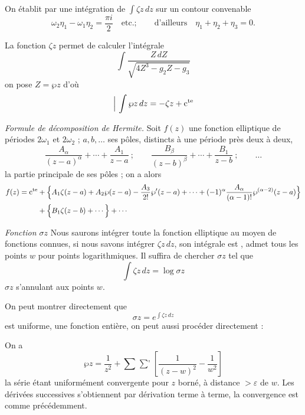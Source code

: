 \documentclass[11pt,a4paper]{article}
\begin{document}
On établit par une intégration de $\int \zeta z\,dz$ sur un contour
convenable
\[
\omega_2\eta_1 - \omega_1\eta_2 = \frac{\pi i}{2} \quad \text{etc.} ;
\qquad \text{d'ailleurs} \quad \eta_1 + \eta_2 + \eta_3 = 0 .
\]

La fonction $\zeta z$ permet de calculer l'intégrale
\[
\int \frac{Z\,dZ}{\sqrt{4Z^3 - g_2Z - g_3}}
\]
on pose $Z = \wp z$ d'où
\[
\Bigl|\ \int \wp z\,dz = -\zeta z + \text{c}^{\text{te}}
\]

\struck{\ill{} \ill{} \ill{},}

\emph{Formule de décomposition de Hermite.} Soit $f(z)$ une fonction elliptique
de périodes $2\omega_1$ et $2\omega_2$ ; $a, b, \ldots$ ses pôles, distincts à une
période près deux à deux,
\[
\frac{A_\alpha}{(z-a)^\alpha} + \cdots + \frac{A_1}{z-a} \ ; \qquad
\frac{B_\beta}{(z-b)^\beta} + \cdots + \frac{B_1}{z-b} \ ; \qquad \ldots
\]
la partie principale de ses pôles ; on a alors
\[
\begin{aligned}
f(z) = \text{c}^{\text{te}} &+ \Bigl\lbrace A_1\zeta(z-a) + A_2\wp(z-a)
- \frac{A_3}{2!}\wp'(z-a) + \cdots
+ (-1)^\alpha \frac{A_\alpha}{(\alpha-1)!}\wp^{(\alpha-2)}(z-a) \Bigr\rbrace \\
&+ \Bigl\lbrace B_1\zeta(z-b) + \cdots \Bigr\rbrace + \cdots
\end{aligned}
\]

\emph{Fonction $\sigma z$}
Nous saurons intégrer toute la fonction elliptique au moyen de fonctions connues,
si nous savons intégrer $\zeta z\,dz$, son intégrale est ,
 admet tous les points $w$ pour points logarithmiques. Il suffira de
chercher $\sigma z$ tel que
\[
\int \zeta z\,dz = \log \sigma z
\]
$\sigma z$ s'annulant aux points $w$.

On peut montrer directement que
\[
\sigma z = e^{\int \zeta z\,dz}
\]
est uniforme,   une fonction entière,
 on peut aussi procéder directement :

On a 
\[
\wp z = \frac{1}{z^2} + \sum\mathop{{\sum}'} \left[\frac{1}{(z-w)^2} - \frac{1}{w^2}\right]
\]
la série étant uniformément convergente pour $z$ borné, à distance
$>\varepsilon$ de $w$. Les dérivées successives s'obtiennent par
dérivation terme à terme, la convergence est comme précédemment.
\end{document}
